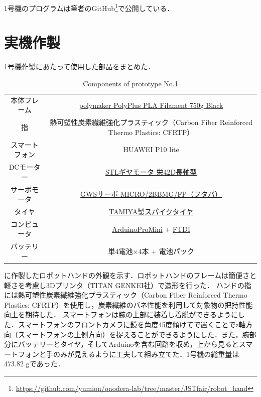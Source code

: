 1号機のプログラムは筆者のGitHub\footnote{\url{https://github.com/yumion/onodera-lab/tree/master/JSTfair/robot_hand}}で公開している．


\section{実機作製}
1号機作製にあたって使用した部品をまとめた．

\begin{table}[H]
    \centering
    \caption{Components of prototype No.1}
    \begin{tabular}{cc}\toprule
        本体フレーム & \href{https://polymaker.com/product/polylite-pla/}{polymaker PolyPlus PLA Filament 750g Black} \\
        指 & 熱可塑性炭素繊維強化プラスティック（Carbon Fiber Reinforced Thermo Plastics: CFRTP） \\
        スマートフォン & HUAWEI P10 lite \\
        DCモーター & \href{http://akizukidenshi.com/catalog/g/gM-12379/}{STLギヤモータ 栄42D長軸型} \\
        サーボモータ & \href{http://akizukidenshi.com/catalog/g/gM-01908/}{GWSサーボ MICRO/2BBMG/FP（フタバ）} \\ 
        タイヤ & \href{https://tamiya.com/japan/products/70194/index.html}{TAMIYA製スパイクタイヤ} \\ 
        コンピュータ & \href{http://akizukidenshi.com/catalog/g/gK-10347/}{ArduinoProMini} + \href{https://www.switch-science.com/catalog/1032/}{FTDI} \\ 
        バッテリー & 単4電池$\times$4本 + 電池パック \\
        \bottomrule
    \end{tabular} 
    \label{tab:1号機部品}
\end{table}

に作製したロボットハンドの外観を示す．ロボットハンドのフレームは簡便さと軽さを考慮し3Dプリンタ（TITAN GENKEI社）で造形を行った．
ハンドの指には熱可塑性炭素繊維強化プラスティック（Carbon Fiber Reinforced Thermo Plastics: CFRTP）を使用し，炭素繊維のバネ性能を利用して対象物の把持性能向上を期待した．
スマートフォンは腕の上部に装着し着脱ができるようにした．スマートフォンのフロントカメラに鏡を角度45度傾けてで置くことでz軸方向（スマートフォンの上側方向）を捉えることができるようにした．また，腕部分にバッテリーとタイヤ，そしてArduinoを含む回路を収め，上から見るとスマートフォンと手のみが見えるように工夫して組み立てた．1号機の総重量は473.82 gであった．

